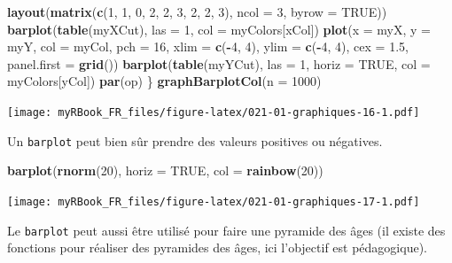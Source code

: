 \documentclass[]{book}
\newenvironment{Shaded}{\begin{snugshade}}{\end{snugshade}}
\newcommand{\DataTypeTok}[1]{\textcolor[rgb]{0.13,0.29,0.53}{#1}}
\newcommand{\DecValTok}[1]{\textcolor[rgb]{0.00,0.00,0.81}{#1}}
\newcommand{\FloatTok}[1]{\textcolor[rgb]{0.00,0.00,0.81}{#1}}
\newcommand{\KeywordTok}[1]{\textcolor[rgb]{0.13,0.29,0.53}{\textbf{#1}}}
\newcommand{\NormalTok}[1]{#1}
\newcommand{\OperatorTok}[1]{\textcolor[rgb]{0.81,0.36,0.00}{\textbf{#1}}}
\newcommand{\OtherTok}[1]{\textcolor[rgb]{0.56,0.35,0.01}{#1}}
\begin{document}
\begin{Shaded}
\begin{Highlighting}[]
  \KeywordTok{layout}\NormalTok{(}\KeywordTok{matrix}\NormalTok{(}\KeywordTok{c}\NormalTok{(}\DecValTok{1}\NormalTok{, }\DecValTok{1}\NormalTok{, }\DecValTok{0}\NormalTok{, }
                  \DecValTok{2}\NormalTok{, }\DecValTok{2}\NormalTok{, }\DecValTok{3}\NormalTok{, }
                  \DecValTok{2}\NormalTok{, }\DecValTok{2}\NormalTok{, }\DecValTok{3}\NormalTok{), }\DataTypeTok{ncol =} \DecValTok{3}\NormalTok{, }\DataTypeTok{byrow =} \OtherTok{TRUE}\NormalTok{))}
  \KeywordTok{barplot}\NormalTok{(}\KeywordTok{table}\NormalTok{(myXCut), }\DataTypeTok{las =} \DecValTok{1}\NormalTok{, }\DataTypeTok{col =}\NormalTok{ myColors[xCol])}
  \KeywordTok{plot}\NormalTok{(}\DataTypeTok{x =}\NormalTok{ myX, }\DataTypeTok{y =}\NormalTok{ myY, }\DataTypeTok{col =}\NormalTok{ myCol, }\DataTypeTok{pch =} \DecValTok{16}\NormalTok{, }
    \DataTypeTok{xlim =} \KeywordTok{c}\NormalTok{(}\OperatorTok{-}\DecValTok{4}\NormalTok{, }\DecValTok{4}\NormalTok{), }\DataTypeTok{ylim =} \KeywordTok{c}\NormalTok{(}\OperatorTok{-}\DecValTok{4}\NormalTok{, }\DecValTok{4}\NormalTok{), }\DataTypeTok{cex =} \FloatTok{1.5}\NormalTok{, }
    \DataTypeTok{panel.first =} \KeywordTok{grid}\NormalTok{())}
  \KeywordTok{barplot}\NormalTok{(}\KeywordTok{table}\NormalTok{(myYCut), }\DataTypeTok{las =} \DecValTok{1}\NormalTok{, }\DataTypeTok{horiz =} \OtherTok{TRUE}\NormalTok{, }\DataTypeTok{col =}\NormalTok{ myColors[yCol])}
  \KeywordTok{par}\NormalTok{(op)}
\NormalTok{\}}
\KeywordTok{graphBarplotCol}\NormalTok{(}\DataTypeTok{n =} \DecValTok{1000}\NormalTok{)}
\end{Highlighting}
\end{Shaded}

\texttt{[image: myRBook\_FR\_files/figure-latex/021-01-graphiques-16-1.pdf]}

Un \texttt{barplot} peut bien sûr prendre des valeurs positives ou négatives.

\begin{Shaded}
\begin{Highlighting}[]
\KeywordTok{barplot}\NormalTok{(}\KeywordTok{rnorm}\NormalTok{(}\DecValTok{20}\NormalTok{), }\DataTypeTok{horiz =} \OtherTok{TRUE}\NormalTok{, }\DataTypeTok{col =} \KeywordTok{rainbow}\NormalTok{(}\DecValTok{20}\NormalTok{))}
\end{Highlighting}
\end{Shaded}

\texttt{[image: myRBook\_FR\_files/figure-latex/021-01-graphiques-17-1.pdf]}

Le \texttt{barplot} peut aussi être utilisé pour faire une pyramide des âges (il existe des fonctions pour réaliser des pyramides des âges, ici l'objectif est pédagogique).
\end{document}
